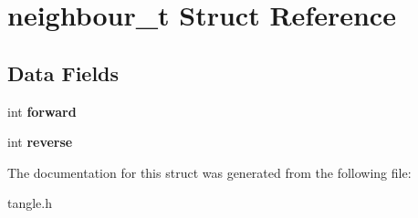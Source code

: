 \hypertarget{structneighbour__t}{}\section{neighbour\+\_\+t Struct Reference}
\label{structneighbour__t}
\subsection*{Data Fields}
\begin{DoxyCompactItemize}
\item 
int {\bfseries forward}\hypertarget{structneighbour__t_a4b5ad7c439d08681ad2ba2fce4aca020}{}\label{structneighbour__t_a4b5ad7c439d08681ad2ba2fce4aca020}

\item 
int {\bfseries reverse}\hypertarget{structneighbour__t_a0b0e9fbcaccd8b4ff1fe906c2b164e78}{}\label{structneighbour__t_a0b0e9fbcaccd8b4ff1fe906c2b164e78}

\end{DoxyCompactItemize}


The documentation for this struct was generated from the following file\+:\begin{DoxyCompactItemize}
\item 
tangle.\+h\end{DoxyCompactItemize}
